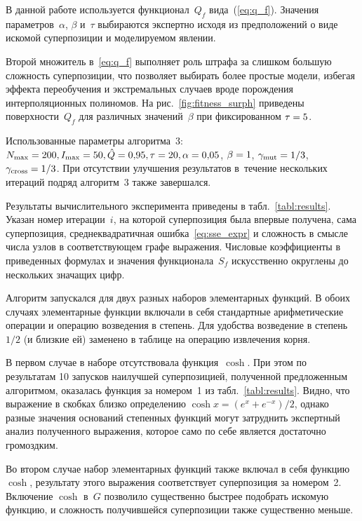 \begin{multicols}{2}
В данной работе используется функционал~$Q_f$ вида~(\ref{eq:q_f}).
Значения параметров~$\alpha$, $\beta$ и~$\tau$
выбираются экспертно исходя из предположений
о виде искомой суперпозиции и моделируемом явлении.

Второй множитель в~\eqref{eq:q_f} выполняет роль штрафа за слишком
большую сложность суперпозиции, что позволяет выбирать более простые модели,
избегая эффекта переобучения и экстремальных случаев вроде порождения
интерполяционных полиномов. На рис.~\ref{fig:fitness_surph}
приведены поверхности~$Q_f$ для различных значений~$\beta$ при фиксированном
$\tau \hm= 5$.



Использованные параметры алгоритма~3: $N_{\max} \hm= 200, I_{\max} \hm= 50,
\hat{Q} \hm= 0{,}95, \tau \hm= 20, \alpha \hm= 0{,}05$, $\beta \hm= 1$, 
$\gamma_{\mathrm{mut}} \hm= {1}/{3}$,
$\gamma_{\mathrm{cross}} \hm= {1}/{3}$. При отсутствии улучшения результатов в~течение
нескольких итераций подряд алгоритм~3 также завершался.

Результаты вычислительного эксперимента приведены в табл.~\ref{tabl:results}.
Указан номер итерации~$i$, на которой суперпозиция была впервые
получена, сама суперпозиция, среднеквадратичная ошибка~\eqref{eq:sse_expr} и сложность в
смысле числа узлов в соответствующем графе выражения. Числовые коэффициенты
в приведенных формулах и значения функционала~$S_f$ искусственно округлены до
нескольких значащих цифр.

Алгоритм запускался для двух разных наборов элементарных функций.
В обоих случаях элементарные функции включали 
в себя стандартные арифметические операции и операцию возведения в степень. 
Для удобства возведение в степень~${1}/{2}$ (и близкие ей) заменено в таблице 
на операцию извлечения корня.


В первом случае в наборе отсутствовала функция~$\cosh$. При этом по результатам
10 запусков наилучшей суперпозицией, полученной предложенным алгоритмом,
оказалась функция за номером~1 из табл.~\ref{tabl:results}. Видно, что выражение
в скобках близко определению $\cosh x = ({e^x + e^{-x}})/2$,
однако разные значения оснований степенных функций могут затруднить экспертный
анализ полученного выражения, которое само по себе является достаточно громоздким.

Во втором случае набор элементарных функций также включал в себя функцию~$\cosh$, 
результату этого выражения соответствует суперпозиция за номером~2.
Включение $\cosh$ в~$G$ позволило существенно быстрее подобрать искомую функцию, и сложность
получившейся суперпозиции также существенно меньше.


\end{multicols}
